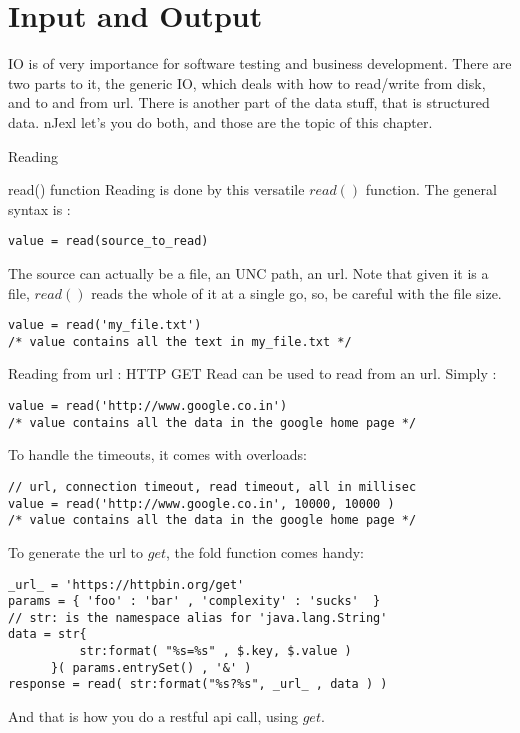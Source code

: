 \chapter{Input and Output}\label{input-output}

{\LARGE IO} is of very importance for software testing
and business development. There are two parts to it, the generic IO, 
which deals with how to read/write from disk, and to and from url.
There is another part of the data stuff, that is structured data.
nJexl let's you do both, and those are the topic of this chapter.

\begin{section}{Reading}

\begin{subsection}{read() function}
Reading is done by this versatile $read()$ function.
The general syntax is :
\begin{lstlisting}[style=JexlStyle]
value = read(source_to_read)
\end{lstlisting}
The source can actually be a file, an UNC path, an url.
Note that given it is a file, $read()$ reads the whole 
of it at a single go, so, be careful with the file size. 

\begin{lstlisting}[style=JexlStyle]
value = read('my_file.txt')
/* value contains all the text in my_file.txt */
\end{lstlisting}
\end{subsection}

\begin{subsection}{Reading from url : HTTP GET}
Read can be used to read from an url.
Simply :

\begin{lstlisting}[style=JexlStyle]
value = read('http://www.google.co.in')
/* value contains all the data in the google home page */
\end{lstlisting}

To handle the timeouts, it comes with overloads:
\begin{lstlisting}[style=JexlStyle]
// url, connection timeout, read timeout, all in millisec
value = read('http://www.google.co.in', 10000, 10000 )
/* value contains all the data in the google home page */
\end{lstlisting}

To generate the url to $get$, the fold function comes handy:
\begin{lstlisting}[style=JexlStyle]
_url_ = 'https://httpbin.org/get'
params = { 'foo' : 'bar' , 'complexity' : 'sucks'  }
// str: is the namespace alias for 'java.lang.String'
data = str{  
          str:format( "%s=%s" , $.key, $.value )  
      }( params.entrySet() , '&' )
response = read( str:format("%s?%s", _url_ , data ) )
\end{lstlisting}
And that is how you do a restful api call, using $get$.
\end{subsection}


\end{section}
